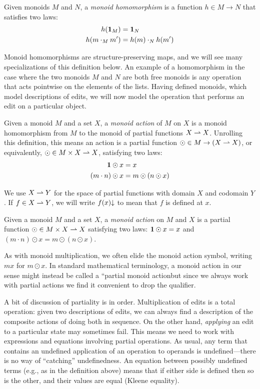 \iffull
\begin{defn}
    Given monoids $M$ and $N$, a \emph{monoid homomorphism} is a function $h
    \in M \to N$ that satisfies two laws:
    \begin{align*}
        h(\mbox{\bf{1}}_M) &= \mbox{\bf{1}}_N \\
        h(m \cdot_M m') &= h(m) \cdot_N h(m')
    \end{align*}
\end{defn}
Monoid homomorphisms are structure-preserving maps, and we will see many
specializations of this definition below. An example of a homomorphism in
the case where the two monoids $M$ and $N$ are both free monoids is any
operation that acts pointwise on the elements of the lists. Having defined
monoids, which model descriptions of edits, we will now model the operation
that performs an edit on a particular object.

\begin{defn}
    Given a  monoid $M$ and a set $X$, a \emph{monoid action} of $M$ on $X$
    is a monoid homomorphism from $M$ to the monoid of partial functions $X
    \rightharpoonup X$. Unrolling this definition, this means an action is a
    partial function $\odot \in M \to (X \rightharpoonup X)$, or equivalently,
    $\odot \in M \times X \rightharpoonup X$, satisfying two laws:
    \begin{align*}
        \mbox{\bf{1}} \odot x &= x \\
        (m \cdot n) \odot x &= m \odot (n \odot x)
    \end{align*}
\end{defn}
We use $X \rightharpoonup Y$ for the space of partial functions with domain $X$
and codomain $Y$. If $f \in X \rightharpoonup Y$, we will write $f(x){\downarrow}$ to
mean that $f$ is defined at $x$.
\else

\begin{defn}
    Given a  monoid $M$ and a set $X$, a \emph{monoid action} on $M$ and $X$
    is a partial function $\odot \in M \times X \rightharpoonup X$ satisfying two laws:
    $\mbox{\bf{1}} \odot x = x$ and $(m \cdot n) \odot x = m \odot (n \odot x)$.
\end{defn}
\fi%
%
As with monoid multiplication, we often elide the monoid action symbol,
writing $mx$ for $m \odot x$.  In standard mathematical terminology, a
monoid action in our sense might instead be called a ``partial monoid
action\commaquote but since we always work with partial actions we find it
convenient to drop the qualifier.

A bit of discussion of partiality is in order.  
Multiplication of edits is a total operation: given two descriptions of
edits, we can always find a description of the composite actions of doing
both in sequence.  On the other hand, {\em applying} an edit to a particular
state may sometimes fail.
%
This means we need to work with expressions and equations involving
partial operations. As usual, any term that contains an undefined
application of an operation to operands is undefined---there is no way of
``catching'' undefinedness. An equation between possibly undefined terms 
(e.g., as in the definition above) 
means that if either side is defined then so is the other, and their values
are equal (Kleene equality).

